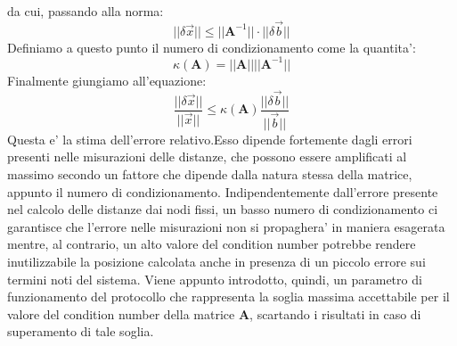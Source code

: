 \newline
da cui, passando alla norma: \newline
\begin{equation}
||\delta\overrightarrow{x}|| \leq ||\textbf{A}^{-1}|| \cdot ||\delta\overrightarrow{b}||
\end{equation}
Definiamo a questo punto il numero di condizionamento come la quantita': \newline
\begin{equation}
\kappa (\textbf{A}) = ||\textbf{A}|| ||\textbf{A}^{-1}|| 
\end{equation}
\newline
Finalmente giungiamo all'equazione: \newline
\begin{equation}
\frac{||\delta\overrightarrow{x}||}{||\overrightarrow{x}||} \leq  \kappa (\textbf{A}) \frac{||\delta\overrightarrow{b}||}{||\overrightarrow{b}||}
\end{equation}
Questa e' la stima dell'errore relativo.Esso dipende fortemente dagli errori presenti nelle misurazioni delle distanze, che possono essere amplificati al massimo secondo un fattore che dipende dalla natura stessa della matrice, appunto il numero di condizionamento. Indipendentemente dall'errore presente nel calcolo delle distanze dai nodi fissi, un basso numero di condizionamento ci garantisce che l'errore nelle misurazioni non si propaghera' in maniera esagerata mentre, al contrario, un alto valore del condition number potrebbe rendere inutilizzabile la posizione calcolata anche in presenza di un piccolo errore sui termini noti del sistema.\newline
Viene appunto introdotto, quindi, un parametro di funzionamento del protocollo che rappresenta la soglia massima accettabile per il valore del condition number della matrice \textbf{A}, scartando i risultati in caso di superamento di tale soglia.

